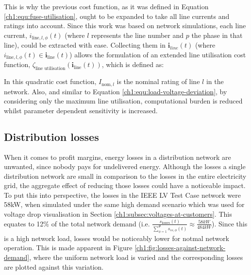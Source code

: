 
This is why the previous cost function, as it was defined in Equation \ref{ch1:equ:fuse-utilisation}, ought to be expanded to take all line currents and ratings into account.
Since this work was based on network simulations, each line current, $i_{\text{line},l,\phi}(t)$ (where $l$ represents the line number and $p$ the phase in that line), could be extracted with ease.
Collecting them in $\textbf{i}_{line}(t)$ (where $i_{\text{line},l,\phi}(t) \in \textbf{i}_\text{line}(t)$) allows the formulation of an extended line utilisation cost function, $\zeta_\text{line utilisation}(\textbf{i}_\text{line}(t))$, which is defined as:



In this quadratic cost function, $I_{\text{nom},l}$ is the nominal rating of line $l$ in the network.
Also, and similar to Equation \ref{ch1:equ:load-voltage-deviation}, by considering only the maximum line utilisation, computational burden is reduced whilst parameter dependent sensitivity is increased.

\subsection{Distribution losses}
\label{ch1:subsec:losses}

When it comes to profit margins, energy losses in a distribution network are unwanted, since nobody pays for undelivered energy.
Although the losses a single distribution network are small in comparison to the losses in the entire electricity grid, the aggregate effect of reducing those losses could have a noticeable impact.
To put this into perspective, the losses in the IEEE LV Test Case network were 58kW, when simulated under the same high demand scenario which was used for voltage drop visualisation in Section \ref{ch1:subsec:voltages-at-customers}.
This equates to 12\% of the total network demand ($\text{i.e. }\frac{s_\text{losses}(t)}{\sum_{\phi=1}^\Phi{s_{ss,\phi}(t)}} \approx \frac{58kW}{484kW}$).
Since this is a high network load, losses would be noticeably lower for notmal network operation.
This is made apparent in Figure \ref{ch1:fig:losses-against-network-demand}, where the uniform network load is varied and the corresponding losses are plotted against this variation.

